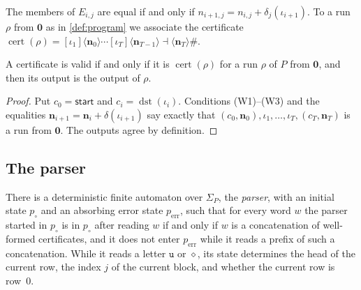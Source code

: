 \documentclass[11pt]{article}
\theoremstyle{plain}
\theoremstyle{definition}
\theoremstyle{remark}
\newcommand{\start}{\mathsf{start}}
\newcommand{\un}{\mathtt{u}}
\newcommand{\fin}{\dashv}
\newcommand{\enc}[1]{\langle #1\rangle}
\newcommand{\dst}{\operatorname{dst}}
\newcommand{\cert}{\operatorname{cert}}
\newcommand{\pin}{p_{\circ}}
\newcommand{\perr}{p_{\mathrm{err}}}
\begin{document}
The members of $E_{i,j}$ are equal if and only if $n_{i+1,j}=n_{i,j}+\delta_j(\iota_{i+1})$. To a run $\rho$ from $\mathbf 0$ as in \cref{def:program} we associate the certificate $\cert(\rho)=[\iota_1]\enc{\mathbf n_0}\cdots[\iota_T]\enc{\mathbf n_{T-1}}\fin\enc{\mathbf n_T}\#$.

\begin{lemma}\label{lem:valid}
A certificate is valid if and only if it is $\cert(\rho)$ for a run $\rho$ of $P$ from $\mathbf 0$, and then its output is the output of $\rho$.
\end{lemma}

\begin{proof}
Put $c_0=\start$ and $c_i=\dst(\iota_i)$. Conditions (W1)--(W3) and the equalities $\mathbf n_{i+1}=\mathbf n_i+\delta(\iota_{i+1})$ say exactly that $(c_0,\mathbf n_0),\iota_1,\dots,\iota_T,(c_T,\mathbf n_T)$ is a run from $\mathbf 0$. The outputs agree by definition.
\end{proof}

\subsection{The parser}

\begin{lemma}\label{lem:parser}
There is a deterministic finite automaton over $\Sigma_P$, the \emph{parser}, with an initial state $\pin$ and an absorbing error state $\perr$, such that for every word $w$ the parser started in $\pin$ is in $\pin$ after reading $w$ if and only if $w$ is a concatenation of well-formed certificates, and it does not enter $\perr$ while it reads a prefix of such a concatenation. While it reads a letter $\un$ or $\diamond$, its state determines the head of the current row, the index $j$ of the current block, and whether the current row is row~$0$.
\end{lemma}
\end{document}
